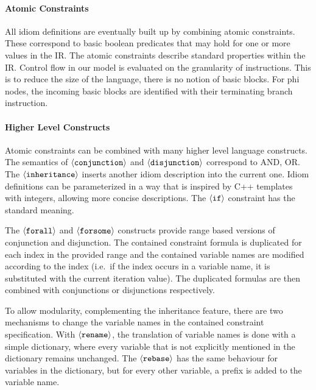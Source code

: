     \paragraph{Atomic Constraints}
    All idiom definitions are eventually built up by combining atomic
    constraints.
    These correspond to basic boolean predicates that may hold for one or more
    values in the IR.
    The atomic constraints describe standard properties within the IR.
    Control flow in our model is evaluated on the granularity of instructions.
    This is to reduce the size of the language, there is no notion of basic
    blocks.
    For phi nodes, the incoming basic blocks are identified with their
    terminating branch instruction.

    \paragraph{Higher Level Constructs}
    Atomic constraints can be combined with many higher level language
    constructs.
    The semantics of $\left<\text{\tt conjunction}\right>$ and $\left<\text{\tt disjunction}\right>$ correspond to AND, OR.
    The $\left<\text{\tt inheritance}\right>$ inserts another idiom description
    into the current one.
    Idiom definitions can be parameterized in a way that is inspired by C++
    templates with integers, allowing more concise descriptions.
    The $\left<\text{\tt if}\right>$ constraint has the standard meaning.

    The $\left<\text{\tt forall}\right>$ and $\left<\text{\tt forsome}\right>$
    constructs provide range based versions of conjunction and disjunction.
    The contained constraint formula is duplicated for each index in the
    provided range and the contained variable names are modified according to
    the index (i.e.\ if the index occurs in a variable name, it is substituted
    with the current iteration value).
    The duplicated formulas are then combined with conjunctions or disjunctions
    respectively.

    To allow modularity, complementing the inheritance feature, there are two
    mechanisms to change the variable names in the contained constraint
    specification.
    With $\left<\text{\tt rename}\right>$, the translation of variable names is
    done with a simple dictionary, where every variable that is not explicitly
    mentioned in the dictionary remains unchanged.
    The $\left<\text{\tt rebase}\right>$ has the same behaviour for variables in
    the dictionary, but for every other variable, a prefix is added to the
    variable name.

